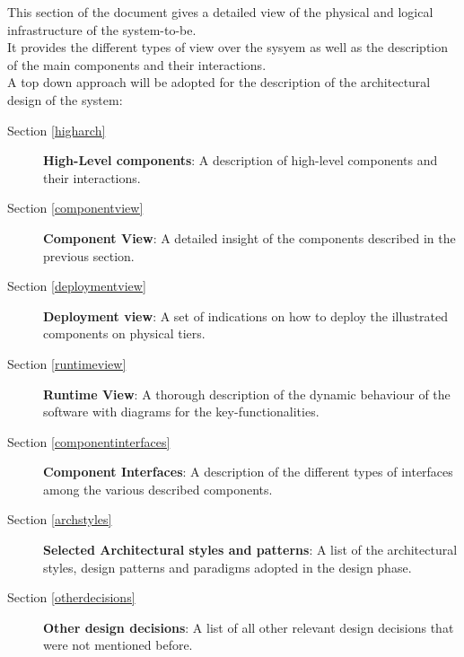 This section of the document gives a detailed view of the physical and logical infrastructure of the system-to-be. 
\\It provides the different types of view over the sysyem as well as the description of the main components and their interactions.
\\A top down approach will be adopted for the description of the architectural design of the system:
\begin{description}
\item[Section \ref{higharch}] \textbf{High-Level components}: A description of high-level components and their interactions.
\item[Section \ref{componentview}] \textbf{Component View}: A detailed insight of the components described in the previous section.
\item[Section \ref{deploymentview}] \textbf{Deployment view}: A set of indications on how to deploy the illustrated components on physical tiers.
\item[Section \ref{runtimeview}] \textbf{Runtime View}: A thorough description of the dynamic behaviour of the software with diagrams for the key-functionalities.
\item[Section \ref{componentinterfaces}] \textbf{Component Interfaces}: A description of the different types of interfaces among the various described components.
\item[Section \ref{archstyles}] \textbf{Selected Architectural styles and patterns}: 
A list of the architectural styles, design patterns and paradigms adopted in the design phase.
\item[Section \ref{otherdecisions}] \textbf{Other design decisions}: A list of all other relevant design decisions that were not mentioned before.
\end{description}